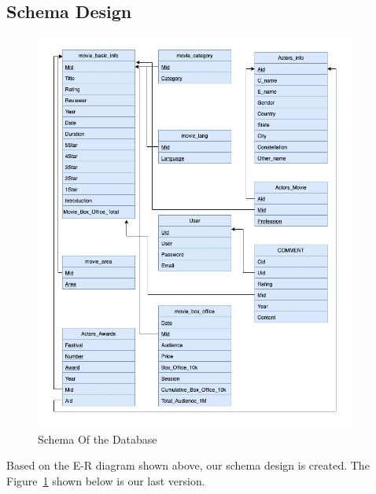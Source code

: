 \documentclass[a4paper]{article}
\begin{document}
  \subsection{Schema Design}

  \begin{figure}[H]
    \centering
    \includegraphics[width=300pt]{figures/schema.jpg}
    \caption{Schema Of the Database}
    \label{fig:schema}
  \end{figure}

Based on the E-R diagram shown above, our schema design is created. The Figure~\ref{fig:schema} shown below is our last version. \par
\end{document}
